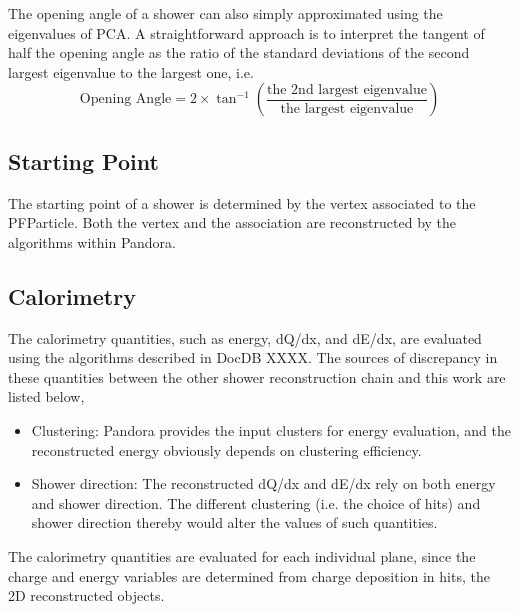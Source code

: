 The opening angle of a shower can also simply approximated using the
eigenvalues of PCA.
A straightforward approach is to interpret the tangent of half the 
opening angle as the ratio of the standard deviations of the second
largest eigenvalue to the largest one, i.e.
\begin{equation}
\label{eq:shropeningangle}
\textrm{Opening Angle} = 2\times \tan^{-1}({\frac{\textrm{the 2nd largest eigenvalue}}{\textrm{the largest eigenvalue}}})
\end{equation}

\subsection{Starting Point}
\label{sec:shr_startingpt}

The starting point of a shower is determined by the vertex associated to
the PFParticle.
Both the vertex and the association are reconstructed by the algorithms
within Pandora.

\subsection{Calorimetry}
\label{sec:shr_calorimetry}

The calorimetry quantities, such as energy, dQ/dx, and dE/dx, are
evaluated using the algorithms described in DocDB XXXX.
The sources of discrepancy in these quantities between the other
shower reconstruction chain and this work are listed below,
\begin{itemize}
\item Clustering: Pandora provides the input clusters for energy
      evaluation, and the reconstructed energy obviously depends
      on clustering efficiency.
\item Shower direction: The reconstructed dQ/dx and dE/dx rely on
      both energy and shower direction.  
      The different clustering (i.e. the  choice of hits) and 
      shower direction thereby would alter the values of such
      quantities.
\end{itemize}

The calorimetry quantities are evaluated for each individual plane,
since the charge and energy variables are determined from charge
deposition in hits, the 2D reconstructed objects.

